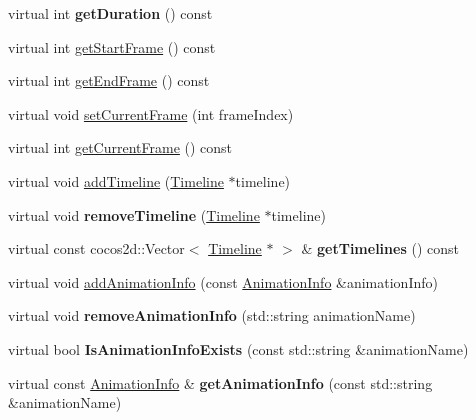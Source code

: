 \begin{DoxyCompactItemize}
\mbox{\label{classActionTimeline_abf818d6b1e6013f8878007f2d485dd42}} 
virtual int {\bfseries get\+Duration} () const
\item 
virtual int \hyperlink{classActionTimeline_a5697337196c4138ac004d88f88e38f5e}{get\+Start\+Frame} () const
\item 
virtual int \hyperlink{classActionTimeline_a1bdee13b0de8081126528d2f7f4e1479}{get\+End\+Frame} () const
\item 
virtual void \hyperlink{classActionTimeline_a9d441e0d690412dba118ae4f98457149}{set\+Current\+Frame} (int frame\+Index)
\item 
virtual int \hyperlink{classActionTimeline_a63469259c3007a0a25eafed675ab3e86}{get\+Current\+Frame} () const
\item 
virtual void \hyperlink{classActionTimeline_ae03c7a4fa82777cf2cb55dd08e691142}{add\+Timeline} (\hyperlink{classTimeline}{Timeline} $\ast$timeline)
\item 
\mbox{\label{classActionTimeline_a5e3612371e7f55a3dc7f534ace4149a0}} 
virtual void {\bfseries remove\+Timeline} (\hyperlink{classTimeline}{Timeline} $\ast$timeline)
\item 
\mbox{\label{classActionTimeline_ac7c643312a8e6ffd450443d4fd8853aa}} 
virtual const cocos2d\+::\+Vector$<$ \hyperlink{classTimeline}{Timeline} $\ast$ $>$ \& {\bfseries get\+Timelines} () const
\item 
virtual void \hyperlink{classActionTimeline_a3a41ddf4a9772663b6f56f9e7347e0ff}{add\+Animation\+Info} (const \hyperlink{structAnimationInfo}{Animation\+Info} \&animation\+Info)
\item 
\mbox{\label{classActionTimeline_a9ff914eab1dffbc1227c898b44745144}} 
virtual void {\bfseries remove\+Animation\+Info} (std\+::string animation\+Name)
\item 
\mbox{\label{classActionTimeline_a4f03c06a13e46c513264706124d790e5}} 
virtual bool {\bfseries Is\+Animation\+Info\+Exists} (const std\+::string \&animation\+Name)
\item 
\mbox{\label{classActionTimeline_a3afaaf2dd8497c6cf7f4711da684af20}} 
virtual const \hyperlink{structAnimationInfo}{Animation\+Info} \& {\bfseries get\+Animation\+Info} (const std\+::string \&animation\+Name)

\end{DoxyCompactItemize}
